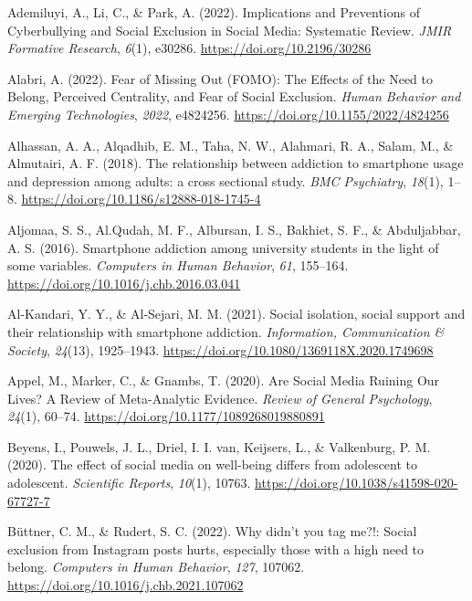 \documentclass[]{interact}
\theoremstyle{plain}%
\theoremstyle{definition}
\theoremstyle{remark}
\newlength{\cslhangindent}
\newenvironment{CSLReferences}[2] %
 {\begin{list}{}{%
  \setlength{\itemindent}{0pt}
  \setlength{\leftmargin}{0pt}
  \setlength{\parsep}{0pt}
  \ifodd #1
   \setlength{\leftmargin}{\cslhangindent}
   \setlength{\itemindent}{-1\cslhangindent}
  \fi
  \setlength{\itemsep}{#2\baselineskip}}}
 {\end{list}}
\begin{document}
\label{refs}
\begin{CSLReferences}{1}{0}
Ademiluyi, A., Li, C., \& Park, A. (2022). Implications and Preventions
of Cyberbullying and Social Exclusion in Social Media: Systematic
Review. \emph{JMIR Formative Research}, \emph{6}(1), e30286.
\url{https://doi.org/10.2196/30286}

Alabri, A. (2022). Fear of Missing Out (FOMO): The Effects of the Need
to Belong, Perceived Centrality, and Fear of Social Exclusion.
\emph{Human Behavior and Emerging Technologies}, \emph{2022}, e4824256.
\url{https://doi.org/10.1155/2022/4824256}

Alhassan, A. A., Alqadhib, E. M., Taha, N. W., Alahmari, R. A., Salam,
M., \& Almutairi, A. F. (2018). The relationship between addiction to
smartphone usage and depression among adults: a cross sectional study.
\emph{BMC Psychiatry}, \emph{18}(1), 1--8.
\url{https://doi.org/10.1186/s12888-018-1745-4}

Aljomaa, S. S., Al.Qudah, M. F., Albursan, I. S., Bakhiet, S. F., \&
Abduljabbar, A. S. (2016). Smartphone addiction among university
students in the light of some variables. \emph{Computers in Human
Behavior}, \emph{61}, 155--164.
\url{https://doi.org/10.1016/j.chb.2016.03.041}

Al-Kandari, Y. Y., \& Al-Sejari, M. M. (2021). Social isolation, social
support and their relationship with smartphone addiction.
\emph{Information, Communication \& Society}, \emph{24}(13), 1925--1943.
\url{https://doi.org/10.1080/1369118X.2020.1749698}

Appel, M., Marker, C., \& Gnambs, T. (2020). Are Social Media Ruining
Our Lives? A Review of Meta-Analytic Evidence. \emph{Review of General
Psychology}, \emph{24}(1), 60--74.
\url{https://doi.org/10.1177/1089268019880891}

Beyens, I., Pouwels, J. L., Driel, I. I. van, Keijsers, L., \&
Valkenburg, P. M. (2020). The effect of social media on well-being
differs from adolescent to adolescent. \emph{Scientific Reports},
\emph{10}(1), 10763. \url{https://doi.org/10.1038/s41598-020-67727-7}

Büttner, C. M., \& Rudert, S. C. (2022). Why didn't you tag me?!: Social
exclusion from Instagram posts hurts, especially those with a high need
to belong. \emph{Computers in Human Behavior}, \emph{127}, 107062.
\url{https://doi.org/10.1016/j.chb.2021.107062}


\end{CSLReferences}
\end{document}
